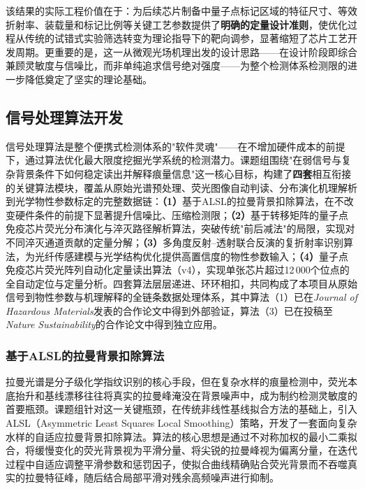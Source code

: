 \documentclass[12pt,a4paper]{article}
\begin{document}
该结果的实际工程价值在于：为后续芯片制备中量子点标记区域的特征尺寸、等效折射率、装载量和标记比例等关键工艺参数提供了\textbf{明确的定量设计准则}，使优化过程从传统的试错式实验筛选转变为理论指导下的靶向调参，显著缩短了芯片工艺开发周期。更重要的是，这一从微观光场机理出发的设计思路——在设计阶段即综合兼顾灵敏度与信噪比，而非单纯追求信号绝对强度——为整个检测体系检测限的进一步降低奠定了坚实的理论基础。

\subsection{信号处理算法开发}

信号处理算法是整个便携式检测体系的"软件灵魂"——在不增加硬件成本的前提下，通过算法优化最大限度挖掘光学系统的检测潜力。课题组围绕"在弱信号与复杂背景条件下如何稳定读出并解释痕量信息"这一核心目标，构建了\textbf{四套}相互衔接的关键算法模块，覆盖从原始光谱预处理、荧光图像自动判读、分布演化机理解析到光学物性参数标定的完整数据链：\textbf{（1）}基于ALSL的拉曼背景扣除算法\cite{ref14}，在不改变硬件条件的前提下显著提升信噪比、压缩检测限；\textbf{（2）}基于转移矩阵的量子点免疫芯片荧光分布演化与淬灭路径解析算法，突破传统"前后减法"的局限，实现对不同淬灭通道贡献的定量分解；\textbf{（3）}多角度反射--透射联合反演的复折射率识别算法，为光纤传感建模与光学结构优化提供高置信度的物性参数输入；\textbf{（4）}量子点免疫芯片荧光阵列自动化定量读出算法（v4），实现单张芯片超过12\,000个位点的全自动定位与定量分析。四套算法层层递进、环环相扣，共同构成了本项目从原始信号到物性参数与机理解释的全链条数据处理体系，其中算法（1）已在\textit{Journal of Hazardous Materials}发表的合作论文中得到外部验证，算法（3）已在投稿至\textit{Nature Sustainability}的合作论文中得到独立应用。

\subsubsection{基于ALSL的拉曼背景扣除算法}

拉曼光谱是分子级化学指纹识别的核心手段，但在复杂水样的痕量检测中，荧光本底抬升和基线漂移往往将真实的拉曼峰淹没在背景噪声中，成为制约检测灵敏度的首要瓶颈。课题组针对这一关键瓶颈，在传统非线性基线拟合方法的基础上，引入ALSL（Asymmetric Least Squares Local Smoothing）策略，开发了一套面向复杂水样的自适应拉曼背景扣除算法。算法的核心思想是通过不对称加权的最小二乘拟合，将缓慢变化的荧光背景视为平滑分量、将尖锐的拉曼峰视为偏离分量，在迭代过程中自适应调整平滑参数和惩罚因子，使拟合曲线精确贴合荧光背景而不吞噬真实的拉曼特征峰，随后结合局部平滑对残余高频噪声进行抑制。
\end{document}
